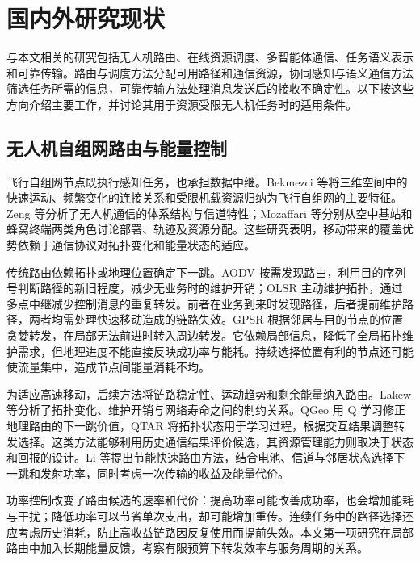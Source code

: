 \section{国内外研究现状}
\label{intro:related}

与本文相关的研究包括无人机路由、在线资源调度、多智能体通信、任务语义表示和可靠传输。路由与调度方法分配可用路径和通信资源，协同感知与语义通信方法筛选任务所需的信息，可靠传输方法处理消息发送后的接收不确定性。以下按这些方向介绍主要工作，并讨论其用于资源受限无人机任务时的适用条件。

\subsection{无人机自组网路由与能量控制}

飞行自组网节点既执行感知任务，也承担数据中继。Bekmezci 等将三维空间中的快速运动、频繁变化的连接关系和受限机载资源归纳为飞行自组网的主要特征\cite{bekmezci2013fanet}。Zeng 等分析了无人机通信的体系结构与信道特性\cite{zeng2016uav}；Mozaffari 等分别从空中基站和蜂窝终端两类角色讨论部署、轨迹及资源分配\cite{mozaffari2019tutorial}。这些研究表明，移动带来的覆盖优势依赖于通信协议对拓扑变化和能量状态的适应。

传统路由依赖拓扑或地理位置确定下一跳。AODV 按需发现路由，利用目的序列号判断路径的新旧程度，减少无业务时的维护开销\cite{aodv}；OLSR 主动维护拓扑，通过多点中继减少控制消息的重复转发\cite{olsr}。前者在业务到来时发现路径，后者提前维护路径，两者均需处理快速移动造成的链路失效。GPSR 根据邻居与目的节点的位置贪婪转发，在局部无法前进时转入周边转发\cite{gpsr}。它依赖局部信息，降低了全局拓扑维护需求，但地理进度不能直接反映成功率与能耗。持续选择位置有利的节点还可能使流量集中，造成节点间能量消耗不均。

为适应高速移动，后续方法将链路稳定性、运动趋势和剩余能量纳入路由。Lakew 等分析了拓扑变化、维护开销与网络寿命之间的制约关系\cite{intro4}。QGeo 用 Q 学习修正地理路由的下一跳价值\cite{qgeo}，QTAR 将拓扑状态用于学习过程，根据交互结果调整转发选择\cite{qtar}。这类方法能够利用历史通信结果评价候选，其资源管理能力则取决于状态和回报的设计。Li 等提出节能快速路由方法，结合电池、信道与邻居状态选择下一跳和发射功率\cite{drlfr}，同时考虑一次传输的收益及能量代价。

功率控制改变了路由候选的速率和代价：提高功率可能改善成功率，也会增加能耗与干扰；降低功率可以节省单次支出，却可能增加重传。连续任务中的路径选择还应考虑历史消耗，防止高收益链路因反复使用而提前失效。本文第一项研究在局部路由中加入长期能量反馈，考察有限预算下转发效率与服务周期的关系。

